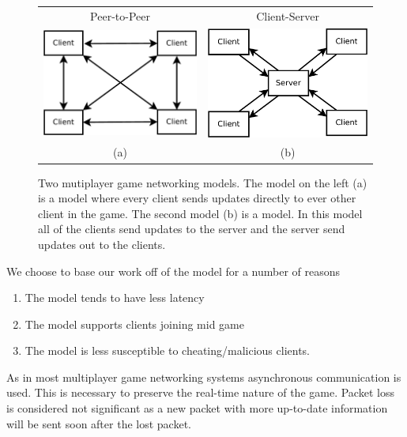 \begin{figure}[ht]
	\centering
	\begin{tabular}{c c}
		Peer-to-Peer & Client-Server \\
		\includegraphics[width=0.48\linewidth]{../images/p2p-model-crop.pdf} &
		\includegraphics[width=0.48\linewidth]{../images/client-server-model-crop.pdf} \\
		(a) & (b)
	\end{tabular}

	\caption{\label{figure:p2p-vs-ClientServer} Two mutiplayer game networking models. The model on the left (a) is a \ptoP model where every client sends updates directly to ever other client in the game. The second model (b) is a \clientServer model. In this model all of the clients send updates to the server and the server send updates out to the clients.}
	\end{figure}
	
	We choose to base our work off of the \clientServer model for a number of reasons
	\begin{enumerate}
		\item The \clientServer model tends to have less latency
		\item The \clientServer model supports clients joining mid game
		\item The \clientServer model is less susceptible to cheating/malicious clients.
	\end{enumerate}
	
	As in most multiplayer game networking systems asynchronous communication is used. This is necessary to preserve the real-time nature of the game. Packet loss is considered not significant as a new packet with more up-to-date information will be sent soon after the lost packet.
	
